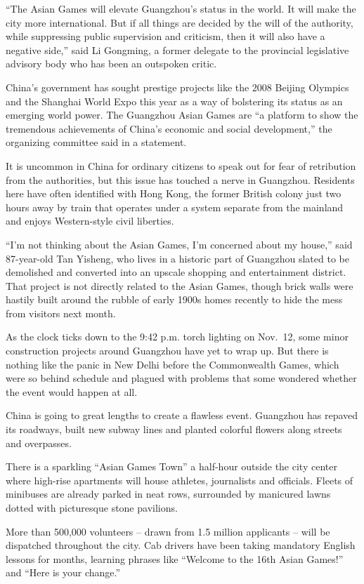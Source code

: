 ﻿\documentclass[12pt]{article}
\begin{document}
``The Asian Games will elevate Guangzhou's status in the world. It will make the city more
international. But if all things are decided by the will of the authority, while suppressing public
supervision and criticism, then it will also have a negative side,'' said Li Gongming, a former
delegate to the provincial legislative advisory body who has been an outspoken critic.

China's government has sought prestige projects like the 2008 Beijing Olympics and the Shanghai
World Expo this year as a way of bolstering its status as an emerging world power. The Guangzhou
Asian Games are ``a platform to show the tremendous achievements of China's economic and social
development,'' the organizing committee said in a statement.

It is uncommon in China for ordinary citizens to speak out for fear of retribution from the
authorities, but this issue has touched a nerve in Guangzhou. Residents here have often identified
with Hong Kong, the former British colony just two hours away by train that operates under a system
separate from the mainland and enjoys Western-style civil liberties.

``I'm not thinking about the Asian Games, I'm concerned about my house,'' said 87-year-old Tan
Yisheng, who lives in a historic part of Guangzhou slated to be demolished and converted into an
upscale shopping and entertainment district. That project is not directly related to the Asian
Games, though brick walls were hastily built around the rubble of early 1900s homes recently to hide
the mess from visitors next month.

As the clock ticks down to the 9:42 p.m. torch lighting on Nov.~12, some minor construction projects
around Guangzhou have yet to wrap up. But there is nothing like the panic in New Delhi before the
Commonwealth Games, which were so behind schedule and plagued with problems that some wondered
whether the event would happen at all.

China is going to great lengths to create a flawless event. Guangzhou has repaved its roadways,
built new subway lines and planted colorful flowers along streets and overpasses.

There is a sparkling ``Asian Games Town'' a half-hour outside the city center where high-rise
apartments will house athletes, journalists and officials. Fleets of minibuses are already parked in
neat rows, surrounded by manicured lawns dotted with picturesque stone pavilions.

More than 500,000 volunteers -- drawn from 1.5 million applicants -- will be dispatched throughout
the city. Cab drivers have been taking mandatory English lessons for months, learning phrases like
``Welcome to the 16th Asian Games!'' and ``Here is your change.''
\end{document}
